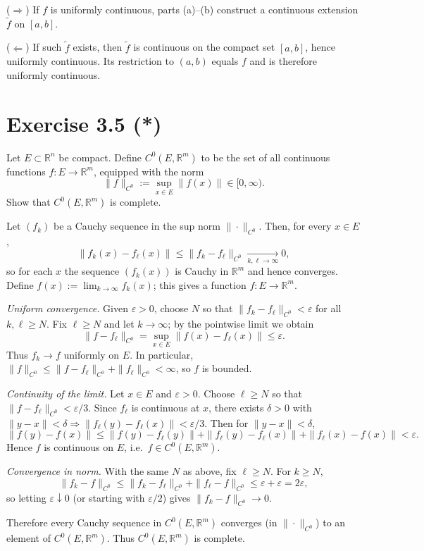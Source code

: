 \begin{enumerate}
\begin{solution}
($\Rightarrow$) If $f$ is uniformly continuous, parts (a)--(b) construct a continuous extension $\tilde f$ on $[a,b]$.

($\Leftarrow$) If such $\tilde f$ exists, then $\tilde f$ is continuous on the compact set $[a,b]$, hence uniformly
continuous. Its restriction to $(a,b)$ equals $f$ and is therefore uniformly continuous.
\end{solution}
\end{enumerate}


\section*{Exercise 3.5 (*)}
Let $E\subset\mathbb{R}^n$ be compact. Define $C^0(E,\mathbb{R}^m)$ to be the set of all continuous
functions $f:E\to\mathbb{R}^m$, equipped with the norm
\[
\|f\|_{C^0}:=\sup_{x\in E}\|f(x)\| \in [0,\infty).
\]
Show that $C^0(E,\mathbb{R}^m)$ is complete.

\begin{solution}
Let $(f_k)$ be a Cauchy sequence in the sup norm $\|\cdot\|_{C^0}$.
Then, for every $x\in E$,
\[
\|f_k(x)-f_\ell(x)\|\le \|f_k-f_\ell\|_{C^0}\xrightarrow[k,\ell\to\infty]{} 0,
\]
so for each $x$ the sequence $(f_k(x))$ is Cauchy in $\mathbb{R}^m$ and hence converges. Define
$f(x):=\lim_{k\to\infty}f_k(x)$; this gives a function $f:E\to\mathbb{R}^m$.

\emph{Uniform convergence.} Given $\varepsilon>0$, choose $N$ so that $\|f_k-f_\ell\|_{C^0}<\varepsilon$ for
all $k,\ell\ge N$. Fix $\ell\ge N$ and let $k\to\infty$; by the pointwise limit we obtain
\[
\|f-f_\ell\|_{C^0}=\sup_{x\in E}\|f(x)-f_\ell(x)\|\le \varepsilon.
\]
Thus $f_k\to f$ uniformly on $E$. In particular, $\|f\|_{C^0}\le \|f-f_\ell\|_{C^0}+\|f_\ell\|_{C^0}<\infty$, so $f$ is bounded.

\emph{Continuity of the limit.} Let $x\in E$ and $\varepsilon>0$. Choose $\ell\ge N$ so that
$\|f-f_\ell\|_{C^0}<\varepsilon/3$. Since $f_\ell$ is continuous at $x$, there exists $\delta>0$ with
$\|y-x\|<\delta\Rightarrow \|f_\ell(y)-f_\ell(x)\|<\varepsilon/3$. Then for $\|y-x\|<\delta$,
\[
\|f(y)-f(x)\|\le \|f(y)-f_\ell(y)\|+\|f_\ell(y)-f_\ell(x)\|+\|f_\ell(x)-f(x)\|<\varepsilon.
\]
Hence $f$ is continuous on $E$, i.e.\ $f\in C^0(E,\mathbb{R}^m)$.

\emph{Convergence in norm.} With the same $N$ as above, fix $\ell\ge N$. For $k\ge N$,
\[
\|f_k-f\|_{C^0}\le \|f_k-f_\ell\|_{C^0}+\|f_\ell-f\|_{C^0}\le \varepsilon+\varepsilon=2\varepsilon,
\]
so letting $\varepsilon\downarrow 0$ (or starting with $\varepsilon/2$) gives $\|f_k-f\|_{C^0}\to 0$.

Therefore every Cauchy sequence in $C^0(E,\mathbb{R}^m)$ converges (in $\|\cdot\|_{C^0}$) to an element of
$C^0(E,\mathbb{R}^m)$. Thus $C^0(E,\mathbb{R}^m)$ is complete.
\end{solution}

